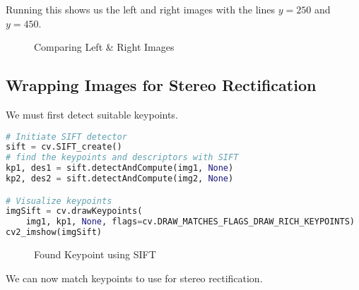 Running this shows us the left and right images with the lines $y=250$ and $y=450$.

\begin{figure}[H]
\centering
\subfloat{\texttt{[image: 1]}}
\caption{Comparing Left \& Right Images}
\end{figure}

\subsection*{Wrapping Images for Stereo Rectification}

We must first detect suitable keypoints. 

\begin{center}{\begin{minipage}{0.9\linewidth}
\begin{lstlisting}[language=Python, basicstyle=\fontsize{8}{10}\selectfont\ttfamily]
# Initiate SIFT detector
sift = cv.SIFT_create()
# find the keypoints and descriptors with SIFT
kp1, des1 = sift.detectAndCompute(img1, None)
kp2, des2 = sift.detectAndCompute(img2, None)

# Visualize keypoints
imgSift = cv.drawKeypoints(
    img1, kp1, None, flags=cv.DRAW_MATCHES_FLAGS_DRAW_RICH_KEYPOINTS)
cv2_imshow(imgSift)
\end{lstlisting}
\end{minipage}}\end{center}

\begin{figure}[H]
\centering
\subfloat{\texttt{[image: 2]}}
\caption{Found Keypoint using SIFT}
\end{figure}

We can now match keypoints to use for stereo rectification. 

